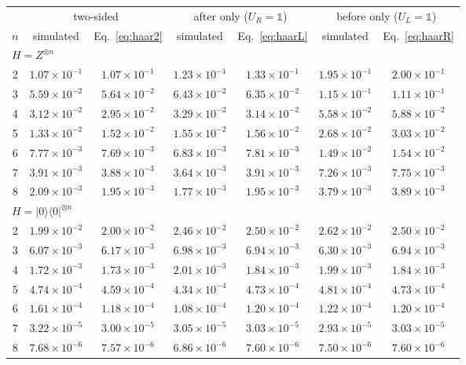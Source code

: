 \begin{tabular}{ccccccc}
\toprule
& \multicolumn{2}{c}{two-sided} & \multicolumn{2}{c}{after only ($U_R = \mathbb{1}$)} & \multicolumn{2}{c}{before only ($U_L = \mathbb{1}$)} \\
\cmidrule(lr){2-3}\cmidrule(lr){4-5}\cmidrule(lr){6-7}
$n$ & simulated & Eq.~\eqref{eq:haar2} & simulated & Eq.~\eqref{eq:haarL} & simulated & Eq.~\eqref{eq:haarR} \\
\midrule
\multicolumn{7}{l}{$H = Z^{\otimes n}$} \\
2 & $1.07\times10^{-1}$ & $1.07\times10^{-1}$ & $1.23\times10^{-1}$ & $1.33\times10^{-1}$ & $1.95\times10^{-1}$ & $2.00\times10^{-1}$ \\
3 & $5.59\times10^{-2}$ & $5.64\times10^{-2}$ & $6.43\times10^{-2}$ & $6.35\times10^{-2}$ & $1.15\times10^{-1}$ & $1.11\times10^{-1}$ \\
4 & $3.12\times10^{-2}$ & $2.95\times10^{-2}$ & $3.29\times10^{-2}$ & $3.14\times10^{-2}$ & $5.58\times10^{-2}$ & $5.88\times10^{-2}$ \\
5 & $1.33\times10^{-2}$ & $1.52\times10^{-2}$ & $1.55\times10^{-2}$ & $1.56\times10^{-2}$ & $2.68\times10^{-2}$ & $3.03\times10^{-2}$ \\
6 & $7.77\times10^{-3}$ & $7.69\times10^{-3}$ & $6.83\times10^{-3}$ & $7.81\times10^{-3}$ & $1.49\times10^{-2}$ & $1.54\times10^{-2}$ \\
7 & $3.91\times10^{-3}$ & $3.88\times10^{-3}$ & $3.64\times10^{-3}$ & $3.91\times10^{-3}$ & $7.26\times10^{-3}$ & $7.75\times10^{-3}$ \\
8 & $2.09\times10^{-3}$ & $1.95\times10^{-3}$ & $1.77\times10^{-3}$ & $1.95\times10^{-3}$ & $3.79\times10^{-3}$ & $3.89\times10^{-3}$ \\
\midrule
\multicolumn{7}{l}{$H = |0\rangle\langle 0|^{\otimes n}$} \\
2 & $1.99\times10^{-2}$ & $2.00\times10^{-2}$ & $2.46\times10^{-2}$ & $2.50\times10^{-2}$ & $2.62\times10^{-2}$ & $2.50\times10^{-2}$ \\
3 & $6.07\times10^{-3}$ & $6.17\times10^{-3}$ & $6.98\times10^{-3}$ & $6.94\times10^{-3}$ & $6.30\times10^{-3}$ & $6.94\times10^{-3}$ \\
4 & $1.72\times10^{-3}$ & $1.73\times10^{-3}$ & $2.01\times10^{-3}$ & $1.84\times10^{-3}$ & $1.99\times10^{-3}$ & $1.84\times10^{-3}$ \\
5 & $4.74\times10^{-4}$ & $4.59\times10^{-4}$ & $4.34\times10^{-4}$ & $4.73\times10^{-4}$ & $4.81\times10^{-4}$ & $4.73\times10^{-4}$ \\
6 & $1.61\times10^{-4}$ & $1.18\times10^{-4}$ & $1.08\times10^{-4}$ & $1.20\times10^{-4}$ & $1.22\times10^{-4}$ & $1.20\times10^{-4}$ \\
7 & $3.22\times10^{-5}$ & $3.00\times10^{-5}$ & $3.05\times10^{-5}$ & $3.03\times10^{-5}$ & $2.93\times10^{-5}$ & $3.03\times10^{-5}$ \\
8 & $7.68\times10^{-6}$ & $7.57\times10^{-6}$ & $6.86\times10^{-6}$ & $7.60\times10^{-6}$ & $7.50\times10^{-6}$ & $7.60\times10^{-6}$ \\
\bottomrule
\end{tabular}
